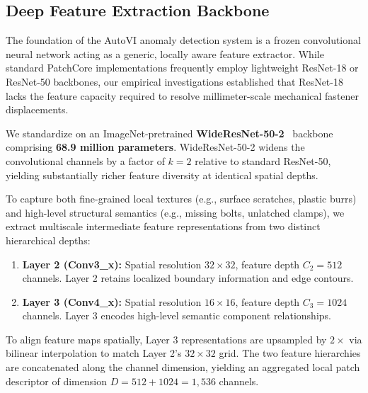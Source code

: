 \documentclass[journal,twocolumn]{IEEEtran}
\begin{document}
\subsection{Deep Feature Extraction Backbone}
The foundation of the AutoVI anomaly detection system is a frozen convolutional neural network acting as a generic, locally aware feature extractor. While standard PatchCore implementations frequently employ lightweight ResNet-18 or ResNet-50 backbones, our empirical investigations established that ResNet-18 lacks the feature capacity required to resolve millimeter-scale mechanical fastener displacements.

We standardize on an ImageNet-pretrained \textbf{WideResNet-50-2}~\cite{zagoruyko2016wide} backbone comprising \textbf{68.9 million parameters}. WideResNet-50-2 widens the convolutional channels by a factor of $k = 2$ relative to standard ResNet-50, yielding substantially richer feature diversity at identical spatial depths.

To capture both fine-grained local textures (e.g., surface scratches, plastic burrs) and high-level structural semantics (e.g., missing bolts, unlatched clamps), we extract multiscale intermediate feature representations from two distinct hierarchical depths:
\begin{enumerate}
    \item \textbf{Layer 2 (Conv3\_x):} Spatial resolution $32 \times 32$, feature depth $C_2 = 512$ channels. Layer 2 retains localized boundary information and edge contours.
    \item \textbf{Layer 3 (Conv4\_x):} Spatial resolution $16 \times 16$, feature depth $C_3 = 1024$ channels. Layer 3 encodes high-level semantic component relationships.
\end{enumerate}

To align feature maps spatially, Layer 3 representations are upsampled by $2\times$ via bilinear interpolation to match Layer 2's $32 \times 32$ grid. The two feature hierarchies are concatenated along the channel dimension, yielding an aggregated local patch descriptor of dimension \textbf{$D = 512 + 1024 = 1,536$} channels.
\end{document}
